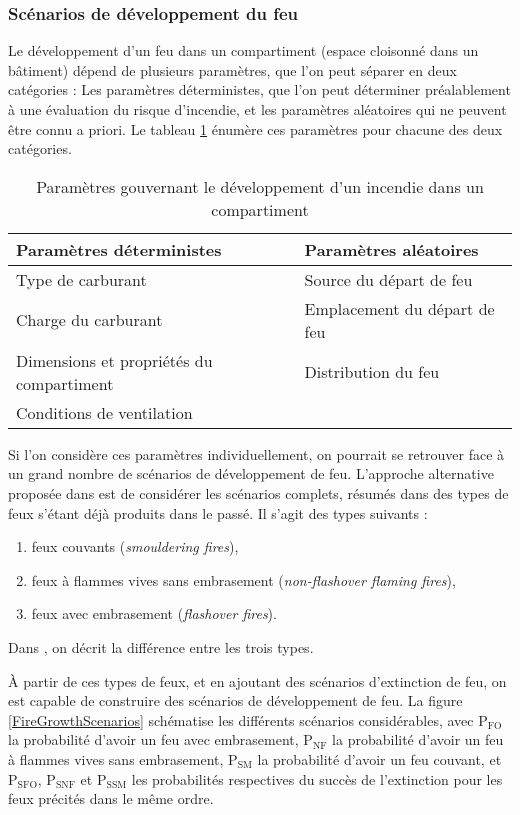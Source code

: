 \documentclass[11pt]{article}
\begin{document}
\subsubsection{Scénarios de développement du feu}

Le développement d'un feu dans un compartiment (espace cloisonné dans un bâtiment)
dépend de plusieurs paramètres, que l'on peut séparer en deux catégories : Les paramètres déterministes, que l'on peut déterminer préalablement à une évaluation du risque d'incendie, et les paramètres aléatoires qui ne peuvent être connu a priori. Le tableau \ref{Tab_par_firegrowth} énumère ces paramètres pour chacune des deux catégories.

\begin{table}
\begin{tabular}{|p{7cm}|p{6cm}|}
\hline
\textbf{Paramètres déterministes} & \textbf{Paramètres aléatoires} \\
\hline
Type de carburant & Source du départ de feu \\
Charge du carburant & Emplacement du départ de feu \\
Dimensions et propriétés du compartiment & Distribution du feu \\
Conditions de ventilation & \\
\hline
\end{tabular}
\caption{Paramètres gouvernant le développement d'un incendie dans un compartiment}\label{Tab_par_firegrowth}
\end{table}

Si l'on considère ces paramètres individuellement, on pourrait se retrouver face à un grand nombre de scénarios de développement de feu. L'approche alternative proposée dans \cite{yung2008principles} est de considérer les scénarios complets, résumés dans des types de feux s'étant déjà produits dans le passé. Il s'agit des types suivants :
\begin{enumerate}
\item feux couvants (\textit{smouldering fires}),
\item feux à flammes vives sans embrasement (\textit{non-flashover flaming fires}),
\item feux avec embrasement (\textit{flashover fires}).
\end{enumerate} 
Dans \cite{eaton1989fire}, on décrit la différence entre les trois types.

À partir de ces types de feux, et en ajoutant des scénarios d'extinction de feu,
on est capable de construire des scénarios de développement de feu. La figure \ref{FireGrowthScenarios} schématise les différents scénarios considérables, avec $\text{P}_{\text{FO}}$ la probabilité d'avoir un feu avec embrasement, $\text{P}_{\text{NF}}$ la probabilité d'avoir un feu à flammes vives sans embrasement, $\text{P}_{\text{SM}}$ la probabilité d'avoir un feu couvant, et $\text{P}_{\text{SFO}}$, $\text{P}_{\text{SNF}}$ et $\text{P}_{\text{SSM}}$ les probabilités respectives du succès de l'extinction pour les feux précités dans le même ordre.
\end{document}
